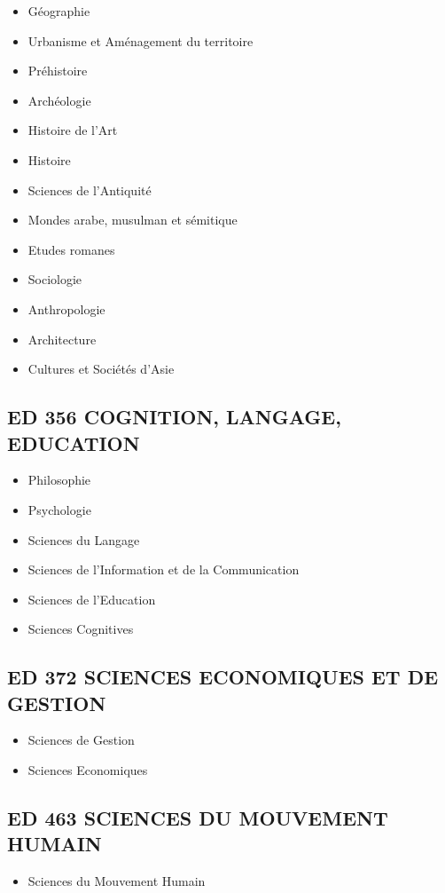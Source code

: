 		\begin{itemize}
		\item Géographie
		\item Urbanisme et Aménagement du territoire
		\item Préhistoire
		\item Archéologie
		\item Histoire de l’Art
		\item Histoire
		\item Sciences de l'Antiquité
		\item Mondes arabe, musulman et sémitique
		\item Etudes romanes
		\item Sociologie
		\item Anthropologie
		\item Architecture
		\item Cultures et Sociétés d'Asie
		\end{itemize}

	\subsection*{ED 356 COGNITION, LANGAGE, EDUCATION}\label{ed-356-cognition-langage-education}

		\begin{itemize}
		\item Philosophie
		\item Psychologie
		\item Sciences du Langage
		\item Sciences de l’Information et de la Communication
		\item Sciences de l’Education
		\item Sciences Cognitives
		\end{itemize}

	\subsection*{ED 372 SCIENCES ECONOMIQUES ET DE GESTION}\label{ed-372-sciences-economiques-et-de-gestion}

		\begin{itemize}
		\item Sciences de Gestion
		\item Sciences Economiques
		\end{itemize}

	\subsection*{ED 463 SCIENCES DU MOUVEMENT HUMAIN}\label{ed-463-sciences-du-mouvement-humain}

		\begin{itemize}
		\item Sciences du Mouvement Humain 
		\end{itemize}

